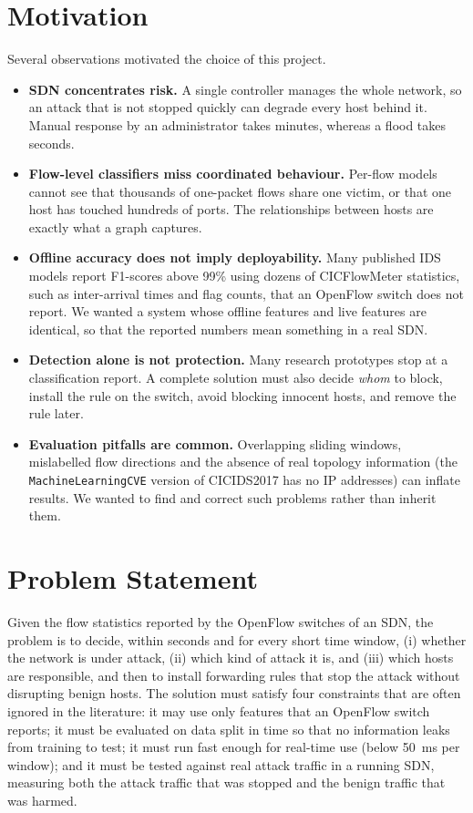 \section{Motivation}

Several observations motivated the choice of this project.

\begin{itemize}
	\item \textbf{SDN concentrates risk.} A single controller manages the whole network, so an attack that is not stopped quickly can degrade every host behind it. Manual response by an administrator takes minutes, whereas a flood takes seconds.
	\item \textbf{Flow-level classifiers miss coordinated behaviour.} Per-flow models cannot see that thousands of one-packet flows share one victim, or that one host has touched hundreds of ports. The relationships between hosts are exactly what a graph captures.
	\item \textbf{Offline accuracy does not imply deployability.} Many published IDS models report F1-scores above 99\% using dozens of CICFlowMeter statistics, such as inter-arrival times and flag counts, that an OpenFlow switch does not report. We wanted a system whose offline features and live features are identical, so that the reported numbers mean something in a real SDN.
	\item \textbf{Detection alone is not protection.} Many research prototypes stop at a classification report. A complete solution must also decide \emph{whom} to block, install the rule on the switch, avoid blocking innocent hosts, and remove the rule later.
	\item \textbf{Evaluation pitfalls are common.} Overlapping sliding windows, mislabelled flow directions and the absence of real topology information (the \texttt{MachineLearningCVE} version of CICIDS2017 has no IP addresses) can inflate results. We wanted to find and correct such problems rather than inherit them.
\end{itemize}


\section{Problem Statement}
Given the flow statistics reported by the OpenFlow switches of an SDN, the problem is to decide, within seconds and for every short time window, (i) whether the network is under attack, (ii) which kind of attack it is, and (iii) which hosts are responsible, and then to install forwarding rules that stop the attack without disrupting benign hosts. The solution must satisfy four constraints that are often ignored in the literature: it may use only features that an OpenFlow switch reports; it must be evaluated on data split in time so that no information leaks from training to test; it must run fast enough for real-time use (below 50~ms per window); and it must be tested against real attack traffic in a running SDN, measuring both the attack traffic that was stopped and the benign traffic that was harmed.


